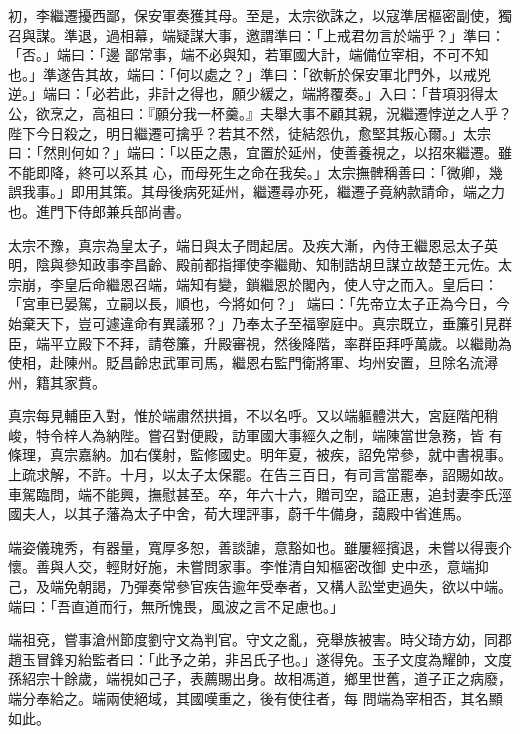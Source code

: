 \begin{pinyinscope}
 初，李繼遷擾西鄙，保安軍奏獲其母。至是，太宗欲誅之，以寇準居樞密副使，獨召與謀。準退，過相幕，端疑謀大事，邀謂準曰：「上戒君勿言於端乎？」準曰：「否。」端曰：「邊
 鄙常事，端不必與知，若軍國大計，端備位宰相，不可不知也。」準遂告其故，端曰：「何以處之？」準曰：「欲斬於保安軍北門外，以戒兇逆。」端曰：「必若此，非計之得也，願少緩之，端將覆奏。」入曰：「昔項羽得太公，欲烹之，高祖曰：『願分我一杯羹。』夫舉大事不顧其親，況繼遷悖逆之人乎？陛下今日殺之，明日繼遷可擒乎？若其不然，徒結怨仇，愈堅其叛心爾。」太宗曰：「然則何如？」端曰：「以臣之愚，宜置於延州，使善養視之，以招來繼遷。雖不能即降，終可以系其
 心，而母死生之命在我矣。」太宗撫髀稱善曰：「微卿，幾誤我事。」即用其策。其母後病死延州，繼遷尋亦死，繼遷子竟納款請命，端之力也。進門下侍郎兼兵部尚書。



 太宗不豫，真宗為皇太子，端日與太子問起居。及疾大漸，內侍王繼恩忌太子英明，陰與參知政事李昌齡、殿前都指揮使李繼勛、知制誥胡旦謀立故楚王元佐。太宗崩，李皇后命繼恩召端，端知有變，鎖繼恩於閣內，使人守之而入。皇后曰：「宮車已晏駕，立嗣以長，順也，今將如何？」
 端曰：「先帝立太子正為今日，今始棄天下，豈可遽違命有異議邪？」乃奉太子至福寧庭中。真宗既立，垂簾引見群臣，端平立殿下不拜，請卷簾，升殿審視，然後降階，率群臣拜呼萬歲。以繼勛為使相，赴陳州。貶昌齡忠武軍司馬，繼恩右監門衛將軍、均州安置，旦除名流潯州，籍其家貲。



 真宗每見輔臣入對，惟於端肅然拱揖，不以名呼。又以端軀體洪大，宮庭階戺稍峻，特令梓人為納陛。嘗召對便殿，訪軍國大事經久之制，端陳當世急務，皆
 有條理，真宗嘉納。加右僕射，監修國史。明年夏，被疾，詔免常參，就中書視事。上疏求解，不許。十月，以太子太保罷。在告三百日，有司言當罷奉，詔賜如故。車駕臨問，端不能興，撫慰甚至。卒，年六十六，贈司空，謚正惠，追封妻李氏涇國夫人，以其子藩為太子中舍，荀大理評事，蔚千牛備身，藹殿中省進馬。



 端姿儀瑰秀，有器量，寬厚多恕，善談謔，意豁如也。雖屢經擯退，未嘗以得喪介懷。善與人交，輕財好施，未嘗問家事。李惟清自知樞密改御
 史中丞，意端抑己，及端免朝謁，乃彈奏常參官疾告逾年受奉者，又構人訟堂吏過失，欲以中端。端曰：「吾直道而行，無所愧畏，風波之言不足慮也。」



 端祖兗，嘗事滄州節度劉守文為判官。守文之亂，兗舉族被害。時父琦方幼，同郡趙玉冒鋒刃紿監者曰：「此予之弟，非呂氏子也。」遂得免。玉子文度為耀帥，文度孫紹宗十餘歲，端視如己子，表薦賜出身。故相馮道，鄉里世舊，道子正之病廢，端分奉給之。端兩使絕域，其國嘆重之，後有使往者，每
 問端為宰相否，其名顯如此。




\end{pinyinscope}
